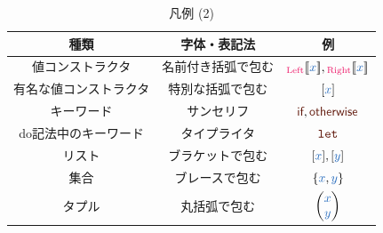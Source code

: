 \documentclass[a5paper,twoside,fleqn,draft]{jsbook}
\begin{document}
\begin{table}[p]
\caption{凡例 (2)}
\begin{center}
\begin{tabular}{||c|c|c||}
\hline
種類&字体・表記法&例\\
\hline\hline
値コンストラクタ&名前付き括弧で包む&$\hLeftWith{\hVar{x}},\hRightWith{\hVar{x}}$\\
有名な値コンストラクタ&特別な括弧で包む&$\hListWith{\hVar{x}}$\\
\hline
キーワード&サンセリフ&$\hIf,\hOtherwise$\\
do記法中のキーワード&タイプライタ&$\hDoLet$\\
\hline
リスト&ブラケットで包む&$\hListWith{\hVar{x}},\hListWith{\hVar{y}}$\\
集合&ブレースで包む&$\{\hVar{x},\hVar{y}\}$\\
タプル&丸括弧で包む&$\hPairWith{\hVar{x}}{\hVar{y}}$\\
\hline
\end{tabular}
\end{center}
\end{table}
\end{document}
